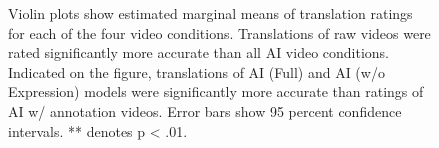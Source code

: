 \begin{figure}[t]
    \centering
    \caption{
    Violin plots show estimated marginal means of translation ratings for each of the four video conditions. Translations of raw videos were rated significantly more accurate than all AI video conditions. Indicated on the figure, translations of AI (Full) and AI (w/o Expression) models were significantly more accurate than ratings of AI w/ annotation videos. Error bars show 95 percent confidence intervals. ** denotes p < .01.
    \label{fig:userstudyresults}
    }
\end{figure}


